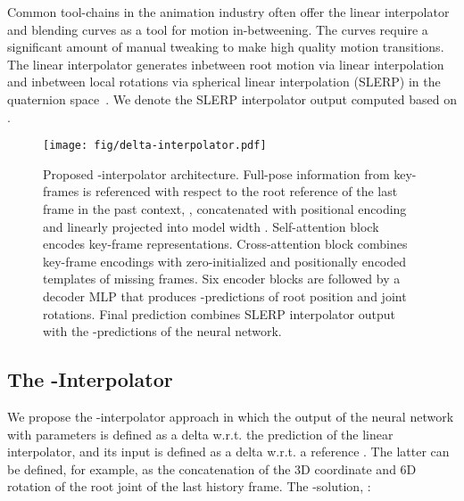 \documentclass[letterpaper]{article} \usepackage[]{aaai23}  \usepackage{times}  \usepackage{helvet}  \usepackage{courier}  \usepackage[hyphens]{url}  \usepackage{graphicx} \urlstyle{rm} \def\UrlFont{\rm}  \usepackage{natbib}  \usepackage{caption} \frenchspacing  \setlength{\pdfpagewidth}{8.5in} \setlength{\pdfpageheight}{11in}
\begin{document}
Common tool-chains in the animation industry often offer the linear interpolator and blending curves as a tool for motion in-betweening. The curves require a significant amount of manual tweaking to make high quality motion transitions. The linear interpolator generates inbetween root motion via linear interpolation and inbetween local rotations via spherical linear interpolation (SLERP) in the quaternion space~\cite{shoemake1985animating}. We denote  the SLERP interpolator output computed based on . 

\begin{figure}[!ht]
    \centering
    \texttt{[image: fig/delta-interpolator.pdf]}
    \caption{Proposed -interpolator architecture. Full-pose information from key-frames is referenced with respect to the root reference of the last frame in the past context, , concatenated with positional encoding and linearly projected into model width . Self-attention block encodes key-frame representations. Cross-attention block combines key-frame encodings with zero-initialized and positionally encoded templates of missing frames. Six encoder blocks are followed by a decoder MLP that produces -predictions of root position and joint rotations. Final prediction combines SLERP interpolator output with the -predictions of the neural network. 
}
    \label{fig:delta_interpolator_architecture}
    \vspace{-1em}
\end{figure}


\subsection{The -Interpolator}

We propose the -interpolator approach in which the output of the neural network  with parameters  is defined as a delta w.r.t. the prediction of the linear interpolator, and its input is defined as a delta w.r.t. a reference . The latter can be defined, for example, as the concatenation of the 3D coordinate and 6D rotation of the root joint of the last history frame. The -solution, :
\end{document}
